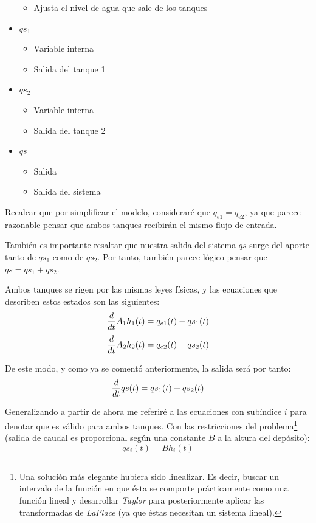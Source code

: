 \documentclass[12pt]{article}
\begin{document}
\begin{itemize}
\begin{itemize}
        \item Ajusta el nivel de agua que sale de los tanques
    \end{itemize}
    \item $qs_1$
    \begin{itemize}
        \item Variable interna
        \item Salida del tanque 1
    \end{itemize}
    \item $qs_2$
    \begin{itemize}
        \item Variable interna
        \item Salida del tanque 2
    \end{itemize}
    \item $qs$
    \begin{itemize}
        \item Salida
        \item Salida del sistema
    \end{itemize}
\end{itemize}
Recalcar que por simplificar el modelo, consideraré que $q_{e1} = q_{e2}$, ya que parece razonable
pensar que ambos tanques recibirán el mismo flujo de entrada.

También es importante resaltar que nuestra salida del sistema $qs$ surge del aporte tanto de $qs_1$
como de $qs_2$. Por tanto, también parece lógico pensar que $qs = qs_1 + qs_2$.

Ambos tanques se rigen por las mismas leyes físicas, y las ecuaciones que describen estos estados son las
siguientes:
\begin{equation}
    \label{eq:tanque1}
    {d \over dt} A_1 h_1(t) = q_{e1}(t) - qs_1(t)
\end{equation}
\begin{equation}
    \label{eq:tanque2}
    {d \over dt} A_2 h_2(t) = q_{e2}(t) - qs_2(t)
\end{equation}

De este modo, y como ya se comentó anteriormente, la salida será por tanto:
\begin{equation}
    \label{eq:salida}
    {d \over dt} qs(t) = qs_1(t) + qs_2(t)
\end{equation}

Generalizando a partir de ahora me referiré a las ecuaciones con subíndice $i$ para denotar que es
válido para ambos tanques. Con las restricciones del problema\footnote{Una solución más elegante hubiera sido linealizar. Es decir, buscar un intervalo de la función en que ésta se comporte prácticamente como una función lineal y desarrollar \emph{Taylor} para posteriormente aplicar las transformadas de \emph{LaPlace} (ya que éstas necesitan un sistema lineal).} (salida de caudal es proporcional
según una constante $B$ a la altura del depósito):
\begin{equation}
    \label{eq:bernoulliqt}
    {qs_i(t) = B h_i(t)}
\end{equation}
\end{document}
